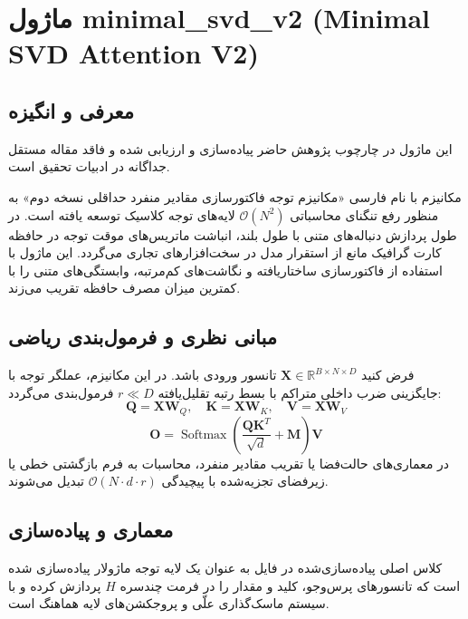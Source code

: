 \section{ماژول minimal\_svd\_v2 (Minimal SVD Attention V2)}
\label{sec:module_minimal_svd_v2}

\subsection{معرفی و انگیزه}
این ماژول در چارچوب پژوهش حاضر پیاده‌سازی و ارزیابی شده و فاقد مقاله مستقل جداگانه در ادبیات تحقیق است.

مکانیزم  با نام فارسی «مکانیزم توجه فاکتورسازی مقادیر منفرد حداقلی نسخه دوم» به منظور رفع تنگنای محاسباتی $\mathcal{O}(N^2)$ لایه‌های توجه کلاسیک توسعه یافته است. در طول پردازش دنباله‌های متنی با طول بلند، انباشت ماتریس‌های موقت توجه در حافظه کارت گرافیک مانع از استقرار مدل در سخت‌افزارهای تجاری می‌گردد. این ماژول با استفاده از فاکتورسازی ساختاریافته و نگاشت‌های کم‌مرتبه، وابستگی‌های متنی را با کمترین میزان مصرف حافظه تقریب می‌زند.

\subsection{مبانی نظری و فرمول‌بندی ریاضی}
فرض کنید $\mathbf{X} \in \mathbb{R}^{B \times N \times D}$ تانسور ورودی باشد. در این مکانیزم، عملگر توجه با جایگزینی ضرب داخلی متراکم با بسط رتبه تقلیل‌یافته $r \ll D$ فرمول‌بندی می‌گردد:
 \begin{equation}
\mathbf{Q} = \mathbf{X} \mathbf{W}_Q, \quad \mathbf{K} = \mathbf{X} \mathbf{W}_K, \quad \mathbf{V} = \mathbf{X} \mathbf{W}_V
\end{equation}
 \begin{equation}
\mathbf{O} = \operatorname{Softmax}\left(\frac{\mathbf{Q} \mathbf{K}^T}{\sqrt{d}} + \mathbf{M}
\right) \mathbf{V}
\end{equation}
در معماری‌های حالت‌فضا یا تقریب مقادیر منفرد، محاسبات به فرم بازگشتی خطی یا زیرفضای تجزیه‌شده با پیچیدگی $\mathcal{O}(N \cdot d \cdot r)$ تبدیل می‌شوند.

\subsection{معماری و پیاده‌سازی}
کلاس اصلی پیاده‌سازی‌شده در فایل  به عنوان یک لایه توجه ماژولار پیاده‌سازی شده است که تانسورهای پرس‌وجو، کلید و مقدار را در فرمت چندسره $H$ پردازش کرده و با سیستم ماسک‌گذاری علّی و پروجکشن‌های لایه هماهنگ است.

